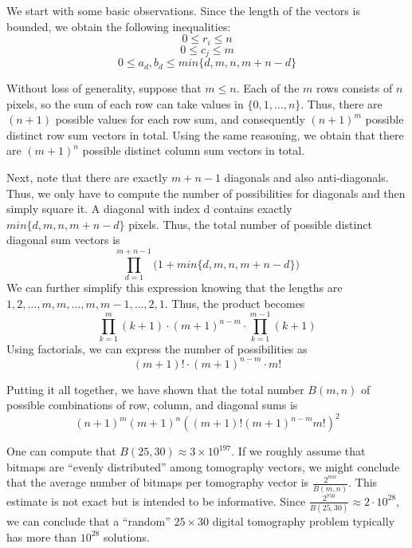 \documentclass{report}
\begin{document}
We start with some basic observations. Since the length of the vectors is bounded, we obtain the following inequalities:
\[0 \le r_i \le n\]
\[0 \le c_j \le m\]
\[0 \le a_d, b_d \le min\{d, m, n, m+n-d\}\]

Without loss of generality, suppose that \(m \le n\).
Each of the \(m\) rows consists of \(n\) pixels, so the sum of each row can take values in \(\{0,1,\dots, n\}\). Thus, there are \((n+1)\) possible values for each row sum, and consequently \((n+1)^m\) possible distinct row sum vectors in total.
Using the same reasoning, we obtain that there are \((m+1)^n\) possible distinct column sum vectors in total.

Next, note that there are exactly \(m+n-1\) diagonals and also anti-diagonals. Thus, we only have to compute the number of possibilities for diagonals and then simply square it. 
A diagonal with index d contains exactly \(min\{d,m,n,m+n-d\}\) pixels. Thus, the total number of possible distinct diagonal sum vectors is \[
\prod_{d=1}^{m+n-1}{(1+min\{d,m,n,m+n-d\}})\]
We can further simplify this expression knowing that the lengths are \(1,2,\dots,m,m,\dots,m,m-1,\dots,2,1\). Thus, the product becomes \[
\prod_{k=1}^m{(k+1)}\cdot(m+1)^{n-m}\cdot\prod_{k=1}^{m-1}{(k+1)}
\]
Using factorials, we can express the number of possibilities as \[
(m+1)! \cdot (m+1)^{n-m} \cdot m!
\]

Putting it all together, we have shown that the total number \(B(m,n)\) of possible combinations of row, column, and diagonal sums is \[
(n+1)^m(m+1)^n((m+1)!(m+1)^{n-m}m!)^2
\]

One can compute that \(B(25,30) \approx 3 \times 10^{197}\). If we roughly assume that bitmaps are ``evenly distributed'' among tomography vectors, we might conclude that the average number of bitmaps per tomography vector is \(\frac{2^{mn}}{B(m,n)}\).
This estimate is not exact but is intended to be informative. Since \(\frac{2^{750}}{B(25,30)} \approx 2 \cdot 10^{28}\), we can conclude that a ``random'' \(25 \times 30\) digital tomography problem typically has more than \(10^{28}\) solutions.
\end{document}
